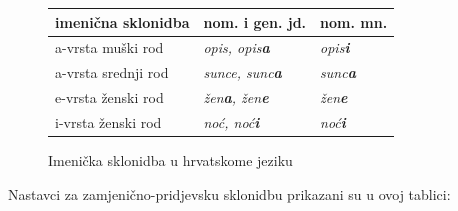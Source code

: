 \begin{multicols}{2}
\begin{figure}[htb]
\centering
	\begin{tabular}{ |l|l|l| }
  \hline
  \textbf{imenična sklonidba} & \textbf{nom. i gen. jd.} & \textbf{nom. mn.}  \\ 
  \hline \hline
  a-vrsta muški rod   & \emph{opis, opis\textbf{a}}     &  \emph{opis\textbf{i}} \\ 
  \hline
  a-vrsta srednji rod   & \emph{sunce, sunc\textbf{a}}     &  \emph{sunc\textbf{a}} \\ 
  \hline
  e-vrsta ženski rod   & \emph{žen\textbf{a}, žen\textbf{e}}     &  \emph{žen\textbf{e}} \\
  \hline
  i-vrsta ženski rod   & \emph{noć, noć\textbf{i}}     &  \emph{noć\textbf{i}} \\
  \hline
  \end{tabular}
  \caption{Imenička sklonidba u hrvatskome jeziku}
  \label{fig:imenicka}
\end{figure}

Nastavci za zamjenično-pridjevsku sklonidbu prikazani su u ovoj tablici:


\end{multicols}
